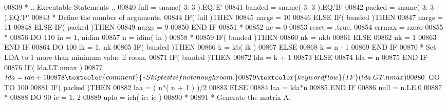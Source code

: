 \begin{DoxyCode}
00839 \textcolor{comment}{*     .. Executable Statements ..}
00840       full = sname( 3: 3 ).EQ.\textcolor{stringliteral}{'E'}
00841       banded = sname( 3: 3 ).EQ.\textcolor{stringliteral}{'B'}
00842       packed = sname( 3: 3 ).EQ.\textcolor{stringliteral}{'P'}
00843 \textcolor{comment}{*     Define the number of arguments.}
00844       \textcolor{keywordflow}{IF}( full )\textcolor{keywordflow}{THEN}
00845          nargs = 10
00846       \textcolor{keywordflow}{ELSE} \textcolor{keywordflow}{IF}( banded )\textcolor{keywordflow}{THEN}
00847          nargs = 11
00848       \textcolor{keywordflow}{ELSE} \textcolor{keywordflow}{IF}( packed )\textcolor{keywordflow}{THEN}
00849          nargs = 9
00850 \textcolor{keywordflow}{      END IF}
00851 \textcolor{comment}{*}
00852       nc = 0
00853       reset = .true.
00854       errmax = rzero
00855 \textcolor{comment}{*}
00856       \textcolor{keywordflow}{DO} 110 in = 1, nidim
00857          n = idim( in )
00858 \textcolor{comment}{*}
00859          \textcolor{keywordflow}{IF}( banded )\textcolor{keywordflow}{THEN}
00860             nk = nkb
00861          \textcolor{keywordflow}{ELSE}
00862             nk = 1
00863 \textcolor{keywordflow}{         END IF}
00864          \textcolor{keywordflow}{DO} 100 ik = 1, nk
00865             \textcolor{keywordflow}{IF}( banded )\textcolor{keywordflow}{THEN}
00866                k = kb( ik )
00867             \textcolor{keywordflow}{ELSE}
00868                k = n - 1
00869 \textcolor{keywordflow}{            END IF}
00870 \textcolor{comment}{*           Set LDA to 1 more than minimum value if room.}
00871             \textcolor{keywordflow}{IF}( banded )\textcolor{keywordflow}{THEN}
00872                lda = k + 1
00873             \textcolor{keywordflow}{ELSE}
00874                lda = n
00875 \textcolor{keywordflow}{            END IF}
00876             \textcolor{keywordflow}{IF}( lda.LT.nmax )
00877      $         lda = lda + 1
00878 \textcolor{comment}{*           Skip tests if not enough room.}
00879             \textcolor{keywordflow}{IF}( lda.GT.nmax )
00880      $         \textcolor{keywordflow}{GO TO} 100
00881             \textcolor{keywordflow}{IF}( packed )\textcolor{keywordflow}{THEN}
00882                laa = ( n*( n + 1 ) )/2
00883             \textcolor{keywordflow}{ELSE}
00884                laa = lda*n
00885 \textcolor{keywordflow}{            END IF}
00886             null = n.LE.0
00887 \textcolor{comment}{*}
00888             \textcolor{keywordflow}{DO} 90 ic = 1, 2
00889                uplo = ich( ic: ic )
00890 \textcolor{comment}{*}
00891 \textcolor{comment}{*              Generate the matrix A.}

\end{DoxyCode}
